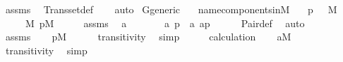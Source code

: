 \begin{isabellebody}
\isatagproof
{}\isamarkupfalse%
\ assms\ \isamarkupfalse%
\ Transset{\isacharunderscore}{\kern0pt}def\isanewline
\ \ \isamarkupfalse%
\ {\isacharparenleft}{\kern0pt}auto{\isacharparenright}{\kern0pt}%
\endisatagproof
{\isafoldproof}%
%
\isadelimproof
\isanewline
%
\endisadelimproof
\isanewline
{}\isamarkupfalse%
\ G{\isacharunderscore}{\kern0pt}generic\ \ \isanewline
\isanewline
{}\isamarkupfalse%
\ name{\isacharunderscore}{\kern0pt}components{\isacharunderscore}{\kern0pt}in{\isacharunderscore}{\kern0pt}M{\isacharcolon}{\kern0pt}\isanewline
\ \ \ {\isachardoublequoteopen}{\isacharless}{\kern0pt}{\isasymsigma}{\isacharcomma}{\kern0pt}p{\isachargreater}{\kern0pt}{\isasymin}{\isasymtheta}{\isachardoublequoteclose}\ {\isachardoublequoteopen}{\isasymtheta}\ {\isasymin}\ M{\isachardoublequoteclose}\isanewline
\ \ \ \ \ {\isachardoublequoteopen}{\isasymsigma}{\isasymin}M{\isachardoublequoteclose}\ {\isachardoublequoteopen}p{\isasymin}M{\isachardoublequoteclose}\isanewline
%
\isadelimproof
%
\endisadelimproof
%
\isatagproof
{}\isamarkupfalse%
\ {\isacharminus}{\kern0pt}\isanewline
\ \ \isamarkupfalse%
\ assms\ \isamarkupfalse%
\ a\ \isanewline
\ \ \ \ {\isachardoublequoteopen}{\isasymsigma}\ {\isasymin}\ a{\isachardoublequoteclose}\ {\isachardoublequoteopen}p\ {\isasymin}\ a{\isachardoublequoteclose}\ {\isachardoublequoteopen}a{\isasymin}{\isacharless}{\kern0pt}{\isasymsigma}{\isacharcomma}{\kern0pt}p{\isachargreater}{\kern0pt}{\isachardoublequoteclose}\isanewline
\ \ \ \ \isamarkupfalse%
\ Pair{\isacharunderscore}{\kern0pt}def\ \isamarkupfalse%
\ auto\isanewline
\ \ \isamarkupfalse%
\ \isamarkupfalse%
\ assms\isanewline
\ \ \isamarkupfalse%
\ {\isachardoublequoteopen}{\isacharless}{\kern0pt}{\isasymsigma}{\isacharcomma}{\kern0pt}p{\isachargreater}{\kern0pt}{\isasymin}M{\isachardoublequoteclose}\isanewline
\ \ \ \ \isamarkupfalse%
\ transitivity\ \isamarkupfalse%
\ simp\isanewline
\ \ \isamarkupfalse%
\ \isamarkupfalse%
\ calculation\isanewline
\ \ \isamarkupfalse%
\ {\isachardoublequoteopen}a{\isasymin}M{\isachardoublequoteclose}\isanewline
\ \ \ \ \isamarkupfalse%
\ transitivity\ \isamarkupfalse%
\ simp\isanewline
\ \ \isamarkupfalse%

\end{isabellebody}
